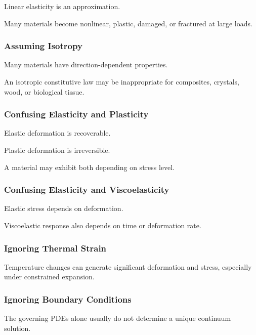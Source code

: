 Linear elasticity is an approximation.

Many materials become nonlinear, plastic, damaged, or fractured at large
loads.

\subsubsection{Assuming Isotropy}

Many materials have direction-dependent properties.

An isotropic constitutive law may be inappropriate for composites, crystals,
wood, or biological tissue.

\subsubsection{Confusing Elasticity and Plasticity}

Elastic deformation is recoverable.

Plastic deformation is irreversible.

A material may exhibit both depending on stress level.

\subsubsection{Confusing Elasticity and Viscoelasticity}

Elastic stress depends on deformation.

Viscoelastic response also depends on time or deformation rate.

\subsubsection{Ignoring Thermal Strain}

Temperature changes can generate significant deformation and stress,
especially under constrained expansion.

\subsubsection{Ignoring Boundary Conditions}

The governing PDEs alone usually do not determine a unique continuum
solution.

